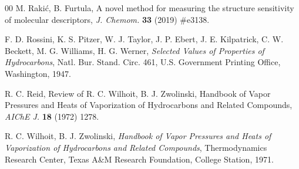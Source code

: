 \documentclass[a5paper, 10pt]{article}
\theoremstyle{plain}
\theoremstyle{remark}
\theoremstyle{definition}
\begin{document}
\begin{thebibliography}{00}
   M. Raki\'c, B. Furtula, A novel method for
  measuring the structure sensitivity of molecular descriptors, \textit{J. Chemom.\/} \textbf{33} (2019) \#e3138.

   F. D. Rossini, K. S. Pitzer, W. J. Taylor,
  J. P. Ebert, J. E. Kilpatrick, C. W. Beckett, M. G. Williams, H. G. Werner,
  \textit{Selected Values of Properties of Hydrocarbons\/}, Natl. Bur.
  Stand. Circ. 461, U.S. Government Printing Office, Washington, 1947.

   R. C. Reid, Review of R. C. Wilhoit, B. J. Zwolinski, Handbook
  of Vapor Pressures and Heats of Vaporization of Hydrocarbons and Related
  Compounds, \textit{AIChE J.\/} \textbf{18} (1972) 1278.

   R. C. Wilhoit, B. J. Zwolinski,
  \textit{Handbook of Vapor Pressures and Heats of Vaporization of
  Hydrocarbons and Related Compounds\/}, Thermodynamics Research Center, Texas A\&M Research Foundation,
  College Station, 1971.

\end{thebibliography}
\end{document}
